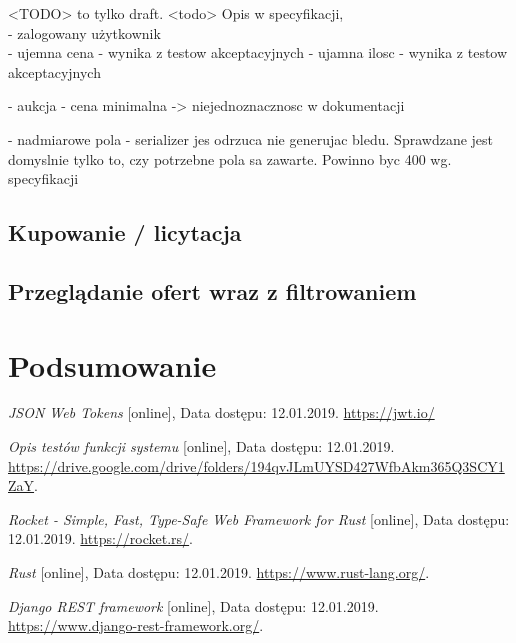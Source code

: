 \documentclass[12pt, notitlepage]{article}
\begin{document}
<TODO> to tylko draft. <todo>
Opis w specyfikacji, \\
- zalogowany użytkownik \\
- ujemna cena - wynika z testow akceptacyjnych
- ujamna ilosc - wynika z testow akceptacyjnych

- aukcja - cena minimalna -> niejednoznacznosc w dokumentacji

- nadmiarowe pola - serializer jes odrzuca nie generujac bledu. Sprawdzane jest domyslnie tylko to, czy potrzebne pola sa zawarte. Powinno byc 400 wg. specyfikacji



\subsection{Kupowanie / licytacja}
\subsection{Przeglądanie ofert wraz z filtrowaniem}

\section{Podsumowanie}

\begin{thebibliography}{9}

\textit{JSON Web Tokens} [online], Data dostępu: 12.01.2019. 
\newline\url{https://jwt.io/}

\textit{Opis testów funkcji systemu} [online], Data dostępu: 12.01.2019. 
\newline\url{https://drive.google.com/drive/folders/194qvJLmUYSD427WfbAkm365Q3SCY1ZaY}.

\textit{Rocket - Simple, Fast, Type-Safe Web Framework for Rust} [online], Data dostępu: 12.01.2019. 
\newline\url{https://rocket.rs/}.

\textit{Rust} [online], Data dostępu: 12.01.2019. 
\newline\url{https://www.rust-lang.org/}.

\textit{Django REST framework} [online], Data dostępu: 12.01.2019. 
\newline\url{https://www.django-rest-framework.org/}.

\end{thebibliography} 
\end{document}
